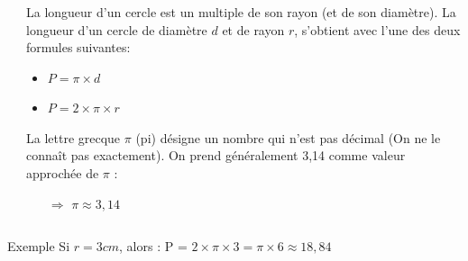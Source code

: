 \documentclass[xcolor=table]{beamer}
\begin{document}
\begin{frame}
	\frametitle{}  
	\framesubtitle{}	
	
	\begin{columns}[onlytextwidth]
		\begin{column}{0.3\textwidth}
			
		\end{column}
		\begin{column}{0.7\textwidth}
			La longueur d'un cercle est un multiple de son rayon (et de son diamètre).
			La longueur d'un cercle de diamètre $d$ et de rayon $r$, s'obtient avec l'une des deux formules suivantes:
			
			\begin{itemize}
				\item $P = \pi \times d$
				\item $P = 2 \times \pi \times r$
			\end{itemize}
			
			La lettre grecque $\pi$ (pi) désigne un nombre qui n'est pas décimal (On ne le connaît pas exactement).
			On prend généralement 3,14 comme valeur approchée de $\pi$ :
			\begin{itemize}
				\item[$\Rightarrow$] $ \pi \approx 3,14$
			\end{itemize}
		\end{column}
	\end{columns}
	
	\begin{block}{Exemple}
		Si $r = 3 cm$, alors : P = $2 \times \pi \times 3 = \pi \times 6 \approx 18,84$
	\end{block}
\end{frame}
	
\end{document}
